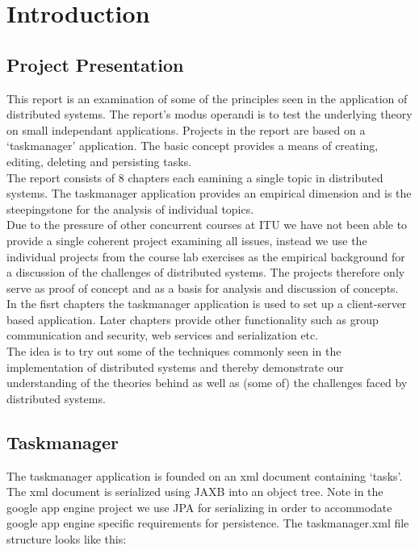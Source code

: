 \chapter{Introduction}
\minitoc

\section{Project Presentation}

This report is an examination of some of the principles seen in the application of distributed systems. The report's modus operandi is to test the underlying theory on small independant applications. Projects in the report are based on a ‘taskmanager’ application. The basic concept provides a means of creating, editing, deleting and persisting tasks. \\

The report consists of 8 chapters each eamining a single topic in distributed systems. The taskmanager application provides an empirical dimension and is the steepingstone for the analysis of individual topics. \\

Due to the pressure of other concurrent courses at ITU we have not been able to provide a single coherent project examining all issues, instead we use the individual projects from the course lab exercises as the empirical background for a discussion of the challenges of distributed systems. The projects therefore only serve as proof of concept and as a basis for analysis and discussion of concepts.  \\

In the fisrt chapters the taskmanager application is used to set up a client-server based application. Later chapters provide other functionality such as group communication and security, web services and serialization etc. \\

The idea is to try out some of the techniques commonly seen in the implementation of distributed systems and thereby demonstrate our understanding of the theories behind as well as (some of) the challenges faced by distributed systems. 

\section{Taskmanager}

The taskmanager application is founded on an xml document containing ‘tasks’. The xml document is serialized using JAXB into an object tree. Note in the google app engine project we use JPA for serializing in order to accommodate google app engine specific requirements for persistence. The taskmanager.xml file structure looks like this:

